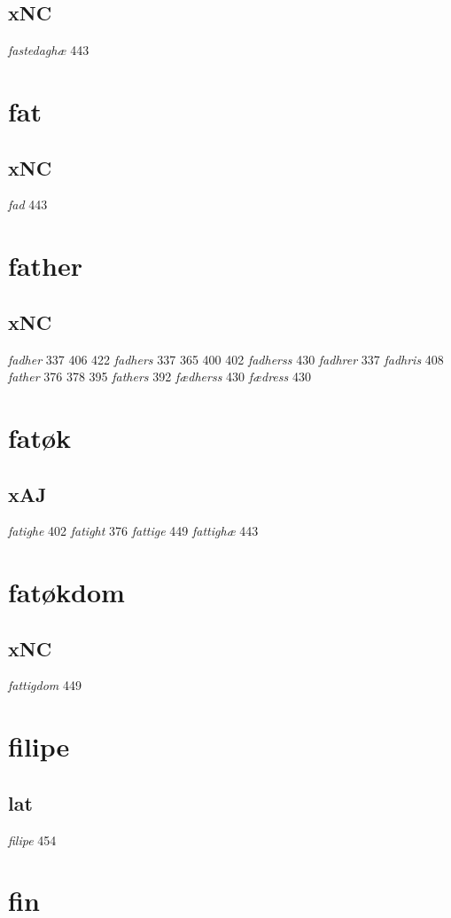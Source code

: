 \documentclass[a4paper,twocolumn]{article}
\begin{document}
\subsection{xNC}
\label{sec:org093efdb}
\emph{fastedaghæ} 443 
\section{fat}
\label{sec:orga073db9}
\subsection{xNC}
\label{sec:org3512d1c}
\emph{fad} 443 
\section{father}
\label{sec:org17be7e4}
\subsection{xNC}
\label{sec:org4579bc6}
\emph{fadher} 337 406 422 \emph{fadhers} 337 365 400 402 \emph{fadherss} 430 \emph{fadhrer} 337 \emph{fadhris} 408 \emph{father} 376 378 395 \emph{fathers} 392 \emph{fædherss} 430 \emph{fædress} 430 
\section{fatøk}
\label{sec:orgc240e86}
\subsection{xAJ}
\label{sec:orgad2e0c6}
\emph{fatighe} 402 \emph{fatight} 376 \emph{fattige} 449 \emph{fattighæ} 443 
\section{fatøkdom}
\label{sec:orgb61c963}
\subsection{xNC}
\label{sec:orgd75dfd9}
\emph{fattigdom} 449 
\section{filipe}
\label{sec:org52b4f81}
\subsection{lat}
\label{sec:orgbf4918a}
\emph{filipe} 454 
\section{fin}
\label{sec:orge142491}
\end{document}
